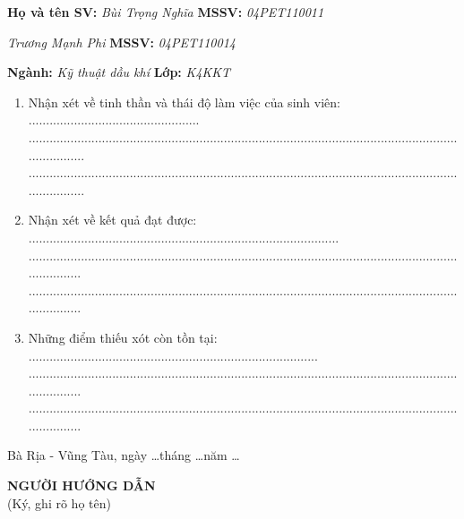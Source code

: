 \documentclass[12pt,a4paper]{article}
\begin{document}
\textbf{Họ và tên SV:} \textit{Bùi Trọng Nghĩa} \hspace{98pt} \textbf{MSSV:} \textit{04PET110011} 

\hspace{68pt} \textit{Trương Mạnh Phi} \hspace{95pt} \textbf{MSSV:} \textit{04PET110014}

\textbf{Ngành:} \textit{Kỹ thuật dầu khí} \hspace{130pt} \textbf{Lớp:} \textit{K4KKT}
\begin{enumerate}
	\item Nhận xét về tinh thần và thái độ làm việc của sinh viên: .................................................\\...........................................................................................................................................\\...........................................................................................................................................
	\item Nhận xét về kết quả đạt được: .........................................................................................\\..........................................................................................................................................\\..........................................................................................................................................
	\item Những điểm thiếu xót còn tồn tại: ...................................................................................\\..........................................................................................................................................\\..........................................................................................................................................
\end{enumerate}
\begin{flushright}
Bà Rịa - Vũng Tàu, ngày \ldots tháng \ldots năm \ldots \\
\end{flushright}
\hspace{300pt} \textbf{NGƯỜI HƯỚNG DẪN}\\
\hspace*{316pt} (Ký, ghi rõ họ tên)
\end{document}
